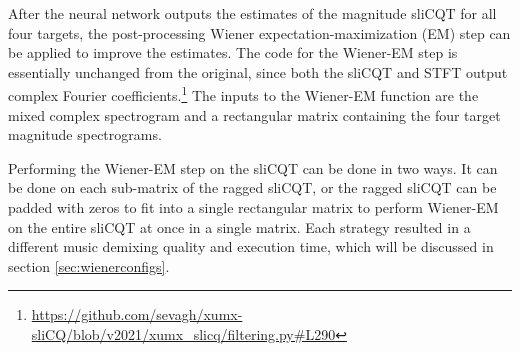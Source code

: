 \documentclass[report.tex]{subfiles}
\begin{document}

After the neural network outputs the estimates of the magnitude sliCQT for all four targets, the post-processing Wiener expectation-maximization (EM) step can be applied to improve the estimates. The code for the Wiener-EM step is essentially unchanged from the original, since both the sliCQT and STFT output complex Fourier coefficients.\footnote{\url{https://github.com/sevagh/xumx-sliCQ/blob/v2021/xumx_slicq/filtering.py\#L290}} The inputs to the Wiener-EM function are the mixed complex spectrogram and a rectangular matrix containing the four target magnitude spectrograms.

Performing the Wiener-EM step on the sliCQT can be done in two ways. It can be done on each sub-matrix of the ragged sliCQT, or the ragged sliCQT can be padded with zeros to fit into a single rectangular matrix to perform Wiener-EM on the entire sliCQT at once in a single matrix. Each strategy resulted in a different music demixing quality and execution time, which will be discussed in section \ref{sec:wienerconfigs}.
\end{document}
